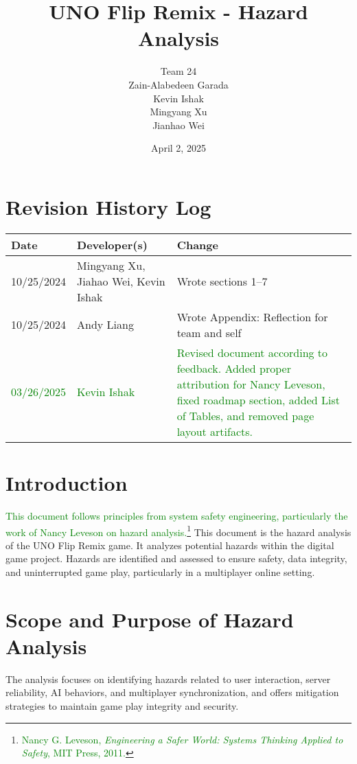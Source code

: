 \documentclass[12pt]{article}
\title{UNO Flip Remix - Hazard Analysis}
\author{Team 24 \\ Zain-Alabedeen Garada \\ Kevin Ishak \\ Mingyang Xu \\ Jianhao Wei \\ \removed{Zheng Bang Liang}}
\date{April 2, 2025}
\newcommand{\added}[1]{\textcolor{green}{#1}}
\begin{document}
\maketitle

\section*{Revision History Log}
\renewcommand{\thetable}{}
\begin{longtable}{|l|l|p{7cm}|}
    \hline
    \textbf{Date} & \textbf{Developer(s)} & \textbf{Change} \\
    \hline
    10/25/2024 & Mingyang Xu, Jiahao Wei, Kevin Ishak & Wrote sections 1--7 \\
    10/25/2024 & Andy Liang & Wrote Appendix: Reflection for team and self \\
    \added{03/26/2025} & \added{Kevin Ishak} & \added{Revised document according to feedback. Added proper attribution for Nancy Leveson, fixed roadmap section, added List of Tables, and removed page layout artifacts.} \\
    \hline
\end{longtable}
\renewcommand{\thetable}{\arabic{table}}

\tableofcontents
\listoftables
\newpage

\section{Introduction}
\added{This document follows principles from system safety engineering, particularly the work of Nancy Leveson on hazard analysis.}\footnote{\textcolor{green}{Nancy G. Leveson, \textit{Engineering a Safer World: Systems Thinking Applied to Safety}, MIT Press, 2011.}} This document is the hazard analysis of the UNO Flip Remix game. It analyzes potential hazards within the digital game project. Hazards are identified and assessed to ensure safety, data integrity, and uninterrupted game play, particularly in a multiplayer online setting.

\section{Scope and Purpose of Hazard Analysis}
The analysis focuses on identifying hazards related to user interaction, server reliability, AI behaviors, and multiplayer synchronization, and offers mitigation strategies to maintain game play integrity and security.
\end{document}
